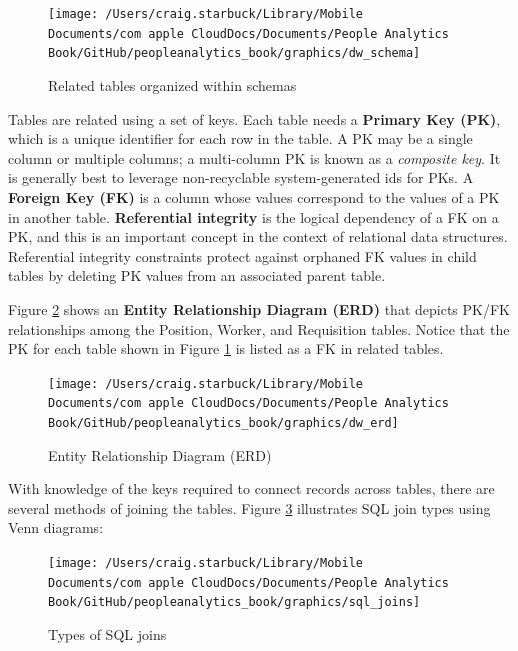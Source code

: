 \documentclass[
]{book}
\begin{document}
\begin{figure}

{\centering \texttt{[image: /Users/craig.starbuck/Library/Mobile Documents/com~apple~CloudDocs/Documents/People Analytics Book/GitHub/peopleanalytics\_book/graphics/dw\_schema]} 

}

\caption{Related tables organized within schemas}\label{fig:data-schemas}
\end{figure}

Tables are related using a set of keys. Each table needs a \textbf{Primary Key (PK)}, which is a unique identifier for each row in the table. A PK may be a single column or multiple columns; a multi-column PK is known as a \emph{composite key}. It is generally best to leverage non-recyclable system-generated ids for PKs. A \textbf{Foreign Key (FK)} is a column whose values correspond to the values of a PK in another table. \textbf{Referential integrity} is the logical dependency of a FK on a PK, and this is an important concept in the context of relational data structures. Referential integrity constraints protect against orphaned FK values in child tables by deleting PK values from an associated parent table.

Figure \ref{fig:erd} shows an \textbf{Entity Relationship Diagram (ERD)} that depicts PK/FK relationships among the Position, Worker, and Requisition tables. Notice that the PK for each table shown in Figure \ref{fig:data-schemas} is listed as a FK in related tables.

\begin{figure}

{\centering \texttt{[image: /Users/craig.starbuck/Library/Mobile Documents/com~apple~CloudDocs/Documents/People Analytics Book/GitHub/peopleanalytics\_book/graphics/dw\_erd]} 

}

\caption{Entity Relationship Diagram (ERD)}\label{fig:erd}
\end{figure}

With knowledge of the keys required to connect records across tables, there are several methods of joining the tables. Figure \ref{fig:sql-joins} illustrates SQL join types using Venn diagrams:

\begin{figure}

{\centering \texttt{[image: /Users/craig.starbuck/Library/Mobile Documents/com~apple~CloudDocs/Documents/People Analytics Book/GitHub/peopleanalytics\_book/graphics/sql\_joins]} 

}

\caption{Types of SQL joins}\label{fig:sql-joins}
\end{figure}
\end{document}
